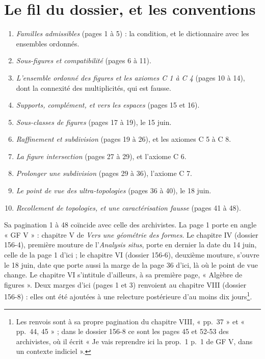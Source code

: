\documentclass[11pt,a4paper]{article}
\begin{document}
\section*{Le fil du dossier, et les conventions}

\begin{enumerate}
\item[1.] \emph{Familles admissibles} (pages 1 à 5) : la condition, et le
dictionnaire avec les ensembles ordonnés.
\item[2.] \emph{Sous-figures et compatibilité} (pages 6 à 11).
\item[3.] \emph{L'ensemble ordonné des figures et les axiomes C 1 à C 4}
(pages 10 à 14), dont la connexité des multiplicités, qui est fausse.
\item[4.] \emph{Supports, complément, et vers les espaces} (pages 15 et 16).
\item[5.] \emph{Sous-classes de figures} (pages 17 à 19), le 15 juin.
\item[6.] \emph{Raffinement et subdivision} (pages 19 à 26), et les axiomes
C 5 à C 8.
\item[7.] \emph{La figure intersection} (pages 27 à 29), et l'axiome C 6.
\item[8.] \emph{Prolonger une subdivision} (pages 29 à 36), l'axiome C 7.
\item[9.] \emph{Le point de vue des ultra-topologies} (pages 36 à 40), le
18 juin.
\item[10.] \emph{Recollement de topologies, et une caractérisation fausse}
(pages 41 à 48).
\end{enumerate}

Sa pagination 1 à 48 coïncide avec celle des archivistes. La page 1 porte en
angle « GF V » : chapitre V de \emph{Vers une géométrie des formes}. Le
chapitre IV (dossier 156-4), première mouture de l'\emph{Analysis situs}, porte
en dernier la date du 14 juin, celle de la page 1 d'ici ; le chapitre VI
(dossier 156-6), deuxième mouture, s'ouvre le 18 juin, date que porte aussi la
marge de la page 36 d'ici, là où le point de vue change. Le chapitre VI
s'intitule d'ailleurs, à sa première page, « Algèbre de figures ». Deux marges
d'ici (pages 1 et 3) renvoient au chapitre VIII (dossier 156-8) : elles ont été
ajoutées à une relecture postérieure d'au moins dix jours\footnote{Les renvois
sont à sa propre pagination du chapitre VIII, « pp.~37 » et « pp.~44, 45 » ;
dans le dossier 156-8 ce sont les pages 45 et 52-53 des archivistes, où il écrit
« Je vais reprendre ici la prop.~1 p.~1 de GF V, dans un contexte indiciel ».}.
\end{document}
